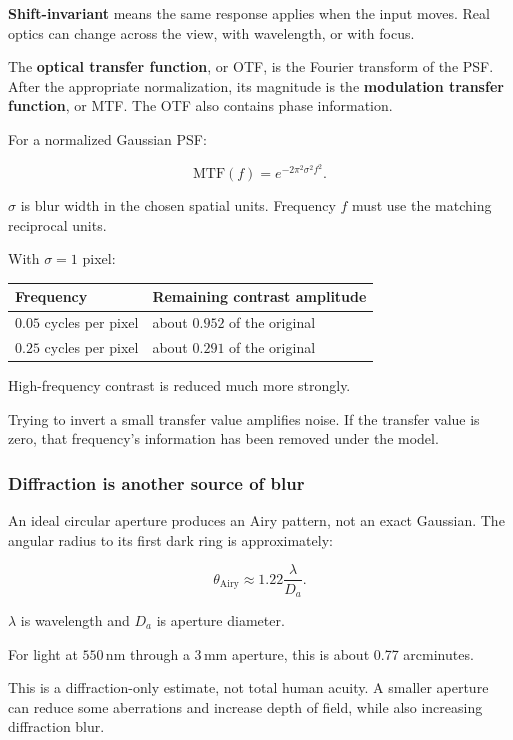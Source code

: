 \textbf{Shift-invariant} means the same response applies when the input moves. Real optics can change across the view, with wavelength, or with focus.

The \textbf{optical transfer function}, or OTF, is the Fourier transform of the PSF. After the appropriate normalization, its magnitude is the \textbf{modulation transfer function}, or MTF. The OTF also contains phase information.

For a normalized Gaussian PSF:

\[
\mathrm{MTF}(f)=e^{-2\pi^2\sigma^2f^2}.
\]

\(\sigma\) is blur width in the chosen spatial units. Frequency \(f\) must use the matching reciprocal units.

With \(\sigma=1\) pixel:

{\def\LTcaptype{none} %
\begin{longtable}[]{@{}ll@{}}
\toprule\noalign{}
Frequency & Remaining contrast amplitude \\
\midrule\noalign{}
\endhead
\bottomrule\noalign{}
\endlastfoot
\(0.05\) cycles per pixel & about \(0.952\) of the original \\
\(0.25\) cycles per pixel & about \(0.291\) of the original \\
\end{longtable}
}

High-frequency contrast is reduced much more strongly.

Trying to invert a small transfer value amplifies noise. If the transfer value is zero, that frequency's information has been removed under the model.

\subsubsection{Diffraction is another source of blur}\label{04-visual-computing-ii-ch043-diffraction-is-another-source-of-blur}

An ideal circular aperture produces an Airy pattern, not an exact Gaussian. The angular radius to its first dark ring is approximately:

\[
\theta_{\mathrm{Airy}}\approx1.22\frac{\lambda}{D_a}.
\]

\(\lambda\) is wavelength and \(D_a\) is aperture diameter.

For light at \(550\,\mathrm{nm}\) through a \(3\,\mathrm{mm}\) aperture, this is about 0.77 arcminutes.

This is a diffraction-only estimate, not total human acuity. A smaller aperture can reduce some aberrations and increase depth of field, while also increasing diffraction blur.

